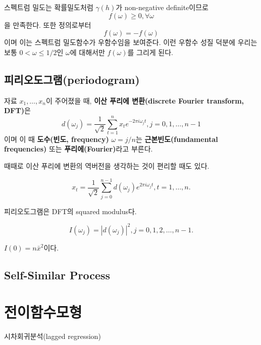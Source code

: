 \documentclass[b5paper,]{scrbook}
\theoremstyle{plain}
\theoremstyle{definition}
\numberwithin{equation}{section}
\let\BeginKnitrBlock\begin \let\EndKnitrBlock\end
\begin{document}
스펙트럼 밀도는 확률밀도처럼 \(\gamma(h)\)가 non-negative definite이므로
\[f(\omega) \geq 0,\forall \omega\] 을 만족한다. 또한 정의로부터
\[f(\omega)=-f(\omega)\] 이며 이는 스펙트럼 밀도함수가 우함수임을
보여준다. 이런 우함수 성질 덕분에 우리는 보통 \(0<\omega \leq 1/2\)인
\(\omega\)에 대해서만 \(f(\omega)\)를 그리게 된다.

\section{피리오도그램(periodogram)}\label{periodogram}

\BeginKnitrBlock{definition}[이산 푸리에 변환]
\protect\hypertarget{def:unnamed-chunk-144}{}{\label{def:unnamed-chunk-144}
{} }자료 \(x_{1},\ldots, x_{n}\)이
주어졌을 때, \textbf{이산 푸리에 변환(discrete Fourier transform,
DFT)}은
\[d(\omega_{j})=\frac{1}{\sqrt{2}}\sum_{t=1}^{n}x_{t}e^{-2\pi i \omega_{j}t}, j=0,1,\ldots, n-1\]
이며 이 때 \textbf{도수(빈도, frequency)} \(\omega = j/n\)는
\textbf{근본빈도(fundamental frequencies)} 또는
\textbf{푸리에(Fourier)}라고 부른다.
\EndKnitrBlock{definition}

때때로 이산 푸리에 변환의 역버전을 생각하는 것이 편리할 때도 있다.

\BeginKnitrBlock{definition}[이산 푸리에 변환의 역버전]
\protect\hypertarget{def:unnamed-chunk-145}{}{\label{def:unnamed-chunk-145}
{}
}\[x_{t}=\frac{1}{\sqrt{2}}\sum_{j=0}^{n-1}d(\omega_{j})e^{2\pi i \omega_{j}t}, t=1,\ldots, n.\]
\EndKnitrBlock{definition}

피리오도그램은 DFT의 squared modulus다.

\BeginKnitrBlock{definition}[피리오도그램]
\protect\hypertarget{def:unnamed-chunk-146}{}{\label{def:unnamed-chunk-146}
{}
}\[I(\omega_{j})=|d(\omega_{j})|^{2}, j=0,1,2,\ldots,n-1.\]
\EndKnitrBlock{definition}

\(I(0)=n\bar{x}^{2}\)이다.

\section{Self-Similar Process}\label{self-similar-process}

\chapter{전이함수모형}\label{transfer}

시차회귀분석(lagged regression)
\end{document}

